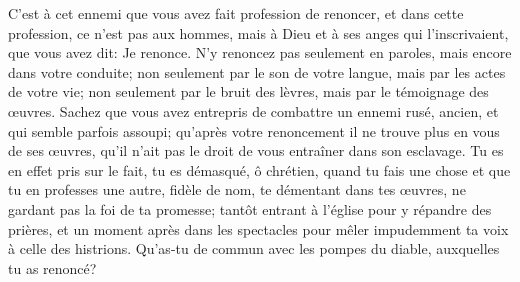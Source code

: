 C’est à cet ennemi que vous avez fait profession de renoncer,
	et dans cette profession, ce n’est pas aux hommes,
	mais à Dieu et à ses anges qui l’inscrivaient,
	que vous avez dit: Je renonce.
N’y renoncez pas seulement en paroles, mais encore dans votre conduite;
	non seulement par le son de votre langue, mais par les actes de votre vie;
	non seulement par le bruit des lèvres, mais par le témoignage des œuvres.
Sachez que vous avez entrepris de combattre un ennemi rusé,
	ancien, et qui semble parfois assoupi;
	qu’après votre renoncement il ne trouve plus en vous de ses œuvres,
	qu’il n’ait pas le droit de vous entraîner dans son esclavage.
Tu es en effet pris sur le fait, tu es démasqué, ô chrétien,
	quand tu fais une chose et que tu en professes une autre,
	fidèle de nom, te démentant dans tes œuvres,
	ne gardant pas la foi de ta promesse;
	tantôt entrant à l’église pour y répandre des prières,
	et un moment après dans les spectacles
	pour mêler impudemment ta voix à celle des histrions.
Qu’as-tu de commun avec les pompes du diable,
	auxquelles tu as renoncé?

